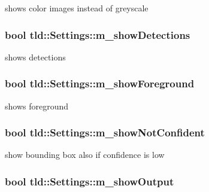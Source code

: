 shows color images instead of greyscale 

\hypertarget{classtld_1_1Settings_abcc93dd632486081ba14ebfaaaecd392}{
\subsubsection[{m\-\_\-show\-Detections}]{\setlength{\rightskip}{0pt plus 5cm}bool tld\-::\-Settings\-::m\-\_\-show\-Detections}}\label{classtld_1_1Settings_abcc93dd632486081ba14ebfaaaecd392}


shows detections 

\hypertarget{classtld_1_1Settings_ab2398d08ccb9bab01c3240651d07f8c3}{
\subsubsection[{m\-\_\-show\-Foreground}]{\setlength{\rightskip}{0pt plus 5cm}bool tld\-::\-Settings\-::m\-\_\-show\-Foreground}}\label{classtld_1_1Settings_ab2398d08ccb9bab01c3240651d07f8c3}


shows foreground 

\hypertarget{classtld_1_1Settings_acd69b3d8edc2fe3a05bb763dfd17b30b}{
\subsubsection[{m\-\_\-show\-Not\-Confident}]{\setlength{\rightskip}{0pt plus 5cm}bool tld\-::\-Settings\-::m\-\_\-show\-Not\-Confident}}\label{classtld_1_1Settings_acd69b3d8edc2fe3a05bb763dfd17b30b}


show bounding box also if confidence is low 

\hypertarget{classtld_1_1Settings_abce1f9678efba0511db88545d97bb535}{
\subsubsection[{m\-\_\-show\-Output}]{\setlength{\rightskip}{0pt plus 5cm}bool tld\-::\-Settings\-::m\-\_\-show\-Output}}\label{classtld_1_1Settings_abce1f9678efba0511db88545d97bb535}



